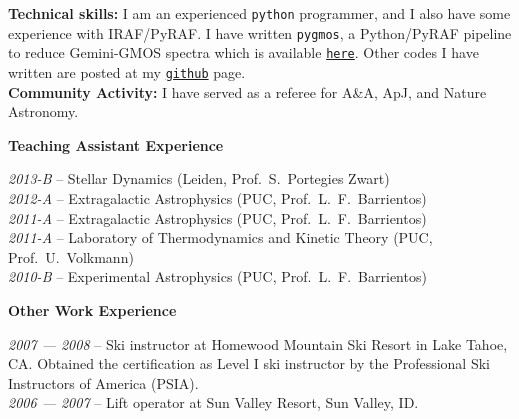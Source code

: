 \documentclass[11pt]{article}
\newcommand\technical[2]{
  \noindent
    {\large\bf #1:} #2\\
  }
\newcommand\sectitle[1]{
  \vspace{0.5cm}
  \noindent
  \textbf{\large #1}\\
  \vspace{-0.2cm}
}
\begin{document}
\vspace{-0.5cm}
\technical{Technical skills}
{I am an experienced \texttt{python} programmer, and I also have some experience 
with IRAF/PyRAF. I have written {\tt pygmos}, a Python/PyRAF pipeline to reduce 
Gemini-GMOS spectra which is available 
\href{https://github.com/cristobal-sifon/pygmos/}{\texttt{here}}. Other codes I 
have written are posted at my 
\href{https://github.com/cristobal-sifon}{\texttt{github}} page.}


%

\technical{Community Activity}
{I have served as a referee for A\&A, ApJ, and Nature Astronomy.}


\pagebreak
\sectitle{Teaching Assistant Experience}

\noindent
\emph{2013-B} -- Stellar Dynamics (Leiden, Prof.~S.~Portegies Zwart)\\
\emph{2012-A} -- Extragalactic Astrophysics (PUC, Prof.~L.~F.~Barrientos)\\
\emph{2011-A} -- Extragalactic Astrophysics (PUC, Prof.~L.~F.~Barrientos)\\
\emph{2011-A} -- Laboratory of Thermodynamics and Kinetic Theory (PUC, Prof.~U.~Volkmann)\\
\emph{2010-B} -- Experimental Astrophysics (PUC, Prof.~L.~F.~Barrientos)


\sectitle{Other Work Experience}

\noindent
\emph{2007 --- 2008} -- Ski instructor at Homewood Mountain Ski Resort in Lake Tahoe, CA. Obtained the certification as Level I ski instructor  by the Professional Ski Instructors of America (PSIA).\\
\emph{2006 --- 2007} -- Lift operator at Sun Valley Resort, Sun Valley, ID.

\vspace{1cm}
\hline
\vspace{1cm}
\end{document}
